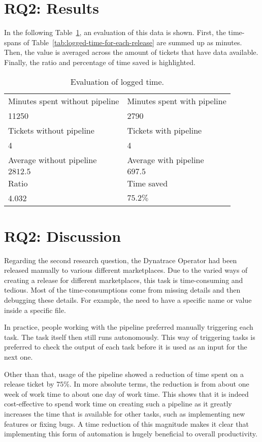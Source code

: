 \section{RQ2: Results}\label{sec:q2:-results}

In the following Table~\ref{tab:evaluation-of-logged-time}, an evaluation of this data is shown.
First, the time-spans of Table~\ref{tab:logged-time-for-each-release} are summed up as minutes.
Then, the value is averaged across the amount of tickets that have data available.
Finally, the ratio and percentage of time saved is highlighted.

\begin{table}[H]
    \centering
    \caption{Evaluation of logged time.}
    \label{tab:evaluation-of-logged-time}
    \begin{tabular}{l|l}
        Minutes spent without pipeline & Minutes spent with pipeline \\
        11250 & 2790 \\
        \hline
        Tickets without pipeline & Tickets with pipeline \\
        4 & 4 \\
        \hline
        Average without pipeline & Average with pipeline \\
        $2812.5$ & $697.5$ \\
        \hline
        Ratio & Time saved \\
        4.032 & $75.2 \%$ \\
    \end{tabular}
\end{table}

\section{RQ2: Discussion}\label{sec:q2:-discussion}

Regarding the second research question, the Dynatrace Operator had been released manually to various different marketplaces.
Due to the varied ways of creating a release for different marketplaces, this task is time-consuming and tedious.
Most of the time-consumptions come from missing details and then debugging these details.
For example, the need to have a specific name or value inside a specific file.

In practice, people working with the pipeline preferred manually triggering each task.
The task itself then still runs autonomously.
This way of triggering tasks is preferred to check the output of each task before it is used as an input for the next one.

Other than that, usage of the pipeline showed a reduction of time spent on a release ticket by $75 \%$.
In more absolute terms, the reduction is from about one week of work time to about one day of work time.
This shows that it is indeed cost-effective to spend work time on creating such a pipeline as it greatly increases the time that is available for other tasks, such as implementing new features or fixing bugs.
A time reduction of this magnitude makes it clear that implementing this form of automation is hugely beneficial to overall productivity.
